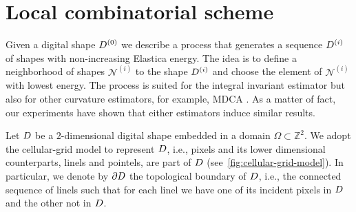 \section{Local combinatorial scheme}
\label{ch6:sec:local-combinatorial-scheme}

Given a digital shape $D^{(0)}$ we describe a process that generates a
sequence $D^{(i)}$ of shapes with non-increasing Elastica energy. The
idea is to define a neighborhood of shapes $\mathcal{N}^{(i)}$ to the
shape $D^{(i)}$ and choose the element of $\mathcal{N}^{(i)}$ with
lowest energy.  The process is suited for the integral invariant
estimator but also for other curvature estimators, for example, MDCA
\cite{roussillon11mdca}. As a matter of fact, our experiments have
shown that either estimators induce similar results.

Let $D$ be a $2$-dimensional digital shape embedded in a domain $\Omega \subset \mathbb{Z}^2$. We adopt the cellular-grid model to represent $D$, i.e., pixels and its lower dimensional counterparts, linels and pointels, are part of $D$ (see~\cref{fig:cellular-grid-model}). In particular, we denote by $\partial D$ the topological boundary of $D$, i.e., the connected sequence of linels such that for each linel we have one of its incident pixels in $D$ and the other not in $D$.

